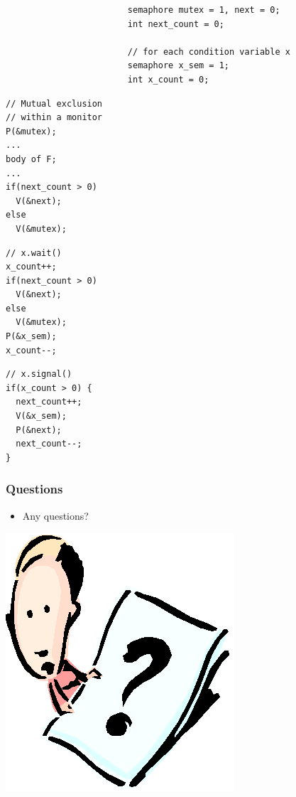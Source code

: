 \documentclass[CJKutf8,xcolor=pdftex,dvipsnames,table]{beamer}
\begin{document}
\begin{CJK*}{UTF8}{song}
\begin{frame}[fragile]
\begin{lstlisting}
                        semaphore mutex = 1, next = 0;
                        int next_count = 0;

                        // for each condition variable x
                        semaphore x_sem = 1;
                        int x_count = 0;
\end{lstlisting} \pause

  \begin{minipage}[c]{0.4\textwidth}

\begin{lstlisting}
// Mutual exclusion
// within a monitor
P(&mutex);
...
body of F;
...
if(next_count > 0)
  V(&next);
else
  V(&mutex);
\end{lstlisting}
    \pause

  \end{minipage}%
  \begin{minipage}[c]{0.3\textwidth}

\begin{lstlisting}
// x.wait()
x_count++;
if(next_count > 0)
  V(&next);
else
  V(&mutex);
P(&x_sem);
x_count--;
\end{lstlisting}

    \pause

  \end{minipage}%
  \begin{minipage}[c]{0.3\textwidth}
\begin{lstlisting}
// x.signal()
if(x_count > 0) {
  next_count++;
  V(&x_sem);
  P(&next);
  next_count--;
}
\end{lstlisting}

  \end{minipage}
\end{frame}

  \begin{frame}
  \frametitle{Questions}
  \begin{itemize}
  \item{Any questions?}
  \end{itemize}
  \begin{center}
    \includegraphics[scale=.5]{question}
  \end{center}
  \end{frame}

\end{CJK*}
\end{document}
